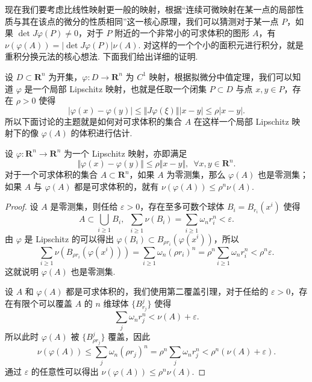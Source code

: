 现在我们要考虑比线性映射更一般的映射，根据“连续可微映射在某一点的局部性质与其在该点的微分的性质相同”这一核心原理，我们可以猜测对于某一点 $P$，如果 $\det J\varphi(P)\neq 0$，对于 $P$ 附近的一个非常小的可求体积的图形 $A$，有 $\nu(\varphi(A)) = \lvert\det J\varphi(P)\rvert \nu(A)$. 对这样的一个个小的面积元进行积分，就是重积分换元法的核心想法. 下面我们给出详细的证明.

设 $D\subset \mathbf{R}^n$ 为开集，$\varphi\colon D\to \mathbf{R}^n$ 为 $C^1$ 映射，根据拟微分中值定理，我们可以知道 $\varphi$ 是一个局部 Lipschitz 映射，也就是任取一个闭集 $P\subset D$ 与点 $x, y\in P$，存在 $\rho > 0$ 使得 \[\vert \varphi(x) - \varphi(y)\vert \leqslant \Vert J\varphi(\xi)\Vert \vert x - y\vert \leqslant \rho \vert x - y\vert.\]
所以下面讨论的主题就是如何对可求体积的集合 $A$ 在这样一个局部 Lipschitz 映射下的像 $\varphi(A)$ 的体积进行估计.

\begin{lemma}{}{}
    设 $\varphi\colon\mathbf{R}^n\to \mathbf{R}^n$ 为一个 Lipschitz 映射，亦即满足\[\Vert \varphi(x) - \varphi(y)\Vert \leqslant \rho \Vert x - y\Vert,\enspace \forall x, y\in\mathbf{R}^n.\]
    对于一个可求体积的集合 $A\subset \mathbf{R}^n$，如果 $A$ 为零测集，那么 $\varphi(A)$ 也是零测集；如果 $A$ 与 $\varphi(A)$ 都是可求体积的，就有 $\nu(\varphi(A)) \leqslant \rho^n\nu(A)$.
\end{lemma}

\begin{proof}
    设 $A$ 是零测集，则任给 $\varepsilon > 0$，存在至多可数个球体 $B_i = B_{r_i}(x^i)$ 使得 \[A\subset \displaystyle\bigcup_{i\geqslant 1}B_i,\enspace \sum_{i\geqslant 1}\nu(B_i) = \sum_{i\geqslant 1}\omega_n r_i^n < \varepsilon.\]
    由 $\varphi$ 是 Lipschitz 的可以得出 $\varphi(B_i) \subset B_{\rho r_i}(\varphi(x^i))$，所以 \[\sum_{i\geqslant 1}\nu(B_{\rho r_i}(\varphi(x^i))) = \sum_{i\geqslant 1}\omega_n (\rho r_i)^n = \rho^n\sum_{i\geqslant 1}\omega_n r_i^n < \rho^n\varepsilon.\]
    这就说明 $\varphi(A)$ 也是零测集.

    设 $A$ 和 $\varphi(A)$ 都是可求体积的，我们使用第二覆盖引理，对于任给的 $\varepsilon > 0$，存在有限个可以覆盖 $A$ 的 $n$ 维球体 $\{B_{r_j}^j\}$ 使得 \[\sum_j\omega_n r_j^n < \nu(A) + \varepsilon.\]
    所以此时 $\varphi(A)$ 被 $\{B_{\rho r_j}^j\}$ 覆盖，因此 \[\nu(\varphi(A))\leqslant \sum_{j}\omega_n (\rho r_j)^n = \rho^n\sum_j\omega_n r_j^n < \rho^n(\nu(A) + \varepsilon).\]
    通过 $\varepsilon$ 的任意性可以得出 $\nu(\varphi(A)) \leqslant \rho^n\nu(A)$.
\end{proof}

